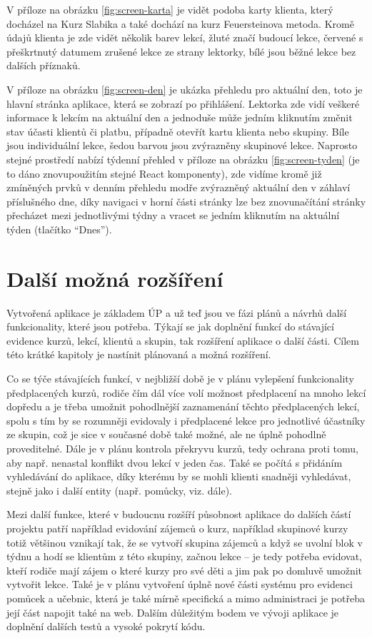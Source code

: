     V příloze na obrázku \ref{fig:screen-karta} je vidět podoba karty klienta, který docházel na Kurz Slabika a také dochází na kurz Feuersteinova metoda. Kromě údajů klienta je zde vidět několik barev lekcí, žluté značí budoucí lekce, červené s přeškrtnutý datumem zrušené lekce ze strany lektorky, bílé jsou běžné lekce bez dalších příznaků.
    
    V příloze na obrázku \ref{fig:screen-den} je ukázka přehledu pro aktuální den, toto je hlavní stránka aplikace, která se zobrazí po přihlášení. Lektorka zde vidí veškeré informace k lekcím na aktuální den a jednoduše může jedním kliknutím změnit stav účasti klientů či platbu, případně otevřít kartu klienta nebo skupiny. Bíle jsou individuální lekce, šedou barvou jsou zvýrazněny skupinové lekce. Naprosto stejné prostředí nabízí týdenní přehled v příloze na obrázku \ref{fig:screen-tyden} (je to dáno znovupoužitím stejné React komponenty), zde vidíme kromě již zmíněných prvků v denním přehledu modře zvýrazněný aktuální den v záhlaví příslušného dne, díky navigaci v horní části stránky lze bez znovunačítání stránky přecházet mezi jednotlivými týdny a vracet se jedním kliknutím na aktuální týden (tlačítko \enquote{Dnes}).
    

\chapter{Další možná rozšíření}\label{dalsirozsireni}
Vytvořená aplikace je základem ÚP a už teď jsou ve fázi plánů a návrhů další funkcionality, které jsou potřeba. Týkají se jak doplnění funkcí do stávající evidence kurzů, lekcí, klientů a skupin, tak rozšíření aplikace o další části. Cílem této krátké kapitoly je nastínit plánovaná a možná rozšíření.

Co se týče stávajících funkcí, v nejbližší době je v plánu vylepšení funkcionality předplacených kurzů, rodiče čím dál více volí možnost předplacení na mnoho lekcí dopředu a je třeba umožnit pohodlnější zaznamenání těchto předplacených lekcí, spolu s tím by se rozumněji evidovaly i předplacené lekce pro jednotlivé účastníky ze skupin, což je sice v současné době také možné, ale ne úplně pohodlně proveditelné. Dále je v plánu kontrola překryvu kurzů, tedy ochrana proti tomu, aby např. nenastal konflikt dvou lekcí v jeden čas. Také se počítá s přidáním vyhledávání do aplikace, díky kterému by se mohli klienti snadněji vyhledávat, stejně jako i další entity (např. pomůcky, viz. dále).

Mezi další funkce, které v budoucnu rozšíří působnost aplikace do dalších částí projektu patří například evidování zájemců o kurz, například skupinové kurzy totiž většinou vznikají tak, že se vytvoří skupina zájemců a když se uvolní blok v týdnu a hodí se klientům z této skupiny, začnou lekce -- je tedy potřeba evidovat, kteří rodiče mají zájem o které kurzy pro své děti a jim pak po domluvě umožnit vytvořit lekce. Také je v plánu vytvoření úplně nové části systému pro evidenci pomůcek a učebnic, která je také mírně specifická a mimo administraci je potřeba její část napojit také na web. Dalším důležitým bodem ve vývoji aplikace je doplnění dalších testů a vysoké pokrytí kódu.

